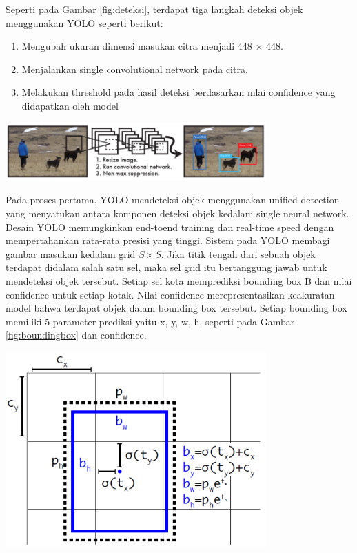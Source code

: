 Seperti pada Gambar \ref{fig:deteksi}, terdapat tiga langkah deteksi objek menggunakan YOLO seperti berikut:
\begin{enumerate}
	\item Mengubah ukuran dimensi masukan citra menjadi 448 × 448.
	\item Menjalankan single convolutional network pada citra.
	\item Melakukan threshold pada hasil deteksi berdasarkan nilai confidence yang didapatkan oleh model
\end{enumerate}

\begin{center}
	\includegraphics[width=0.75\textwidth]{gambar/deteksi.png}
	\citep{Redmon_2016_CVPR}
	\label{fig:deteksi}
\end{center}

Pada proses pertama, YOLO mendeteksi objek menggunakan unified detection yang menyatukan antara komponen deteksi objek kedalam single neural network. Desain YOLO memungkinkan end-toend training dan real-time speed dengan mempertahankan rata-rata
presisi yang tinggi. Sistem pada YOLO membagi gambar masukan
kedalam grid $S \times S$. Jika titik tengah dari sebuah objek terdapat
didalam salah satu sel, maka sel grid itu bertanggung jawab untuk
mendeteksi objek tersebut. Setiap sel kota memprediksi bounding
box B dan nilai confidence untuk setiap kotak. Nilai confidence
merepresentasikan keakuratan model bahwa terdapat objek dalam
bounding box tersebut\citep{Redmon_2016_CVPR}. Setiap bounding box memiliki 5 parameter
prediksi yaitu x, y, w, h, seperti pada Gambar \ref{fig:boundingbox} dan confidence.\citep{yolov3}
\begin{center}
	\includegraphics[width=0.75\textwidth]{gambar/boundingbox.png}
	\citep{yolov3}
	\label{fig:boundingbox}
\end{center}

